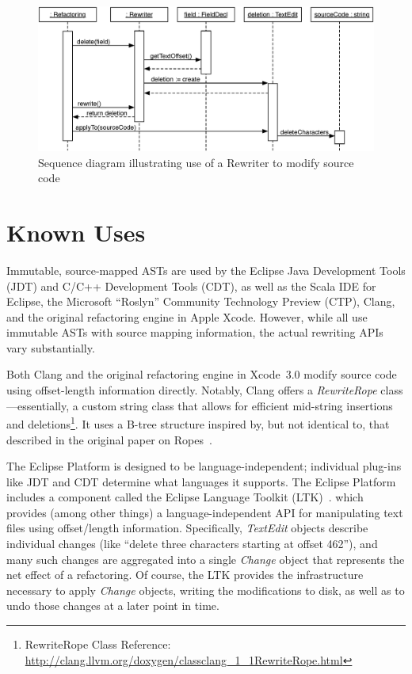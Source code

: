 \documentclass[prodmode]{acmlarge}
\begin{document}
\begin{itemize}
\begin{figure}[!bt]
\begin{center}
\includegraphics[width=.9\textwidth]{seq-diagram.eps}
\end{center}
\caption{Sequence diagram illustrating use of a Rewriter to modify source code}
\label{fig:seq-diagram}
\end{figure}

\end{itemize}

\section{Known Uses}

Immutable, source-mapped ASTs are used by the Eclipse Java Development Tools
(JDT) and C/C++ Development Tools (CDT), as well as the Scala IDE for Eclipse,
the Microsoft ``Roslyn'' Community Technology Preview (CTP), Clang, and the
original refactoring engine in Apple Xcode.  However, while all use immutable
ASTs with source mapping information, the actual rewriting APIs vary
substantially.  

Both Clang and the original refactoring engine in Xcode~3.0 modify source code
using offset-length information directly.  Notably, Clang offers a
\textit{RewriteRope} class---essentially, a custom string class that allows for
efficient mid-string insertions and
deletions\footnote{RewriteRope Class Reference: \url{http://clang.llvm.org/doxygen/classclang_1_1RewriteRope.html}}.
It uses a B-tree structure inspired by, but not identical to, that described
in the original paper on Ropes~\cite{boehm95ropes}.
 
The Eclipse Platform is designed to be language-independent; individual
plug-ins like JDT and CDT determine what languages it supports.  The Eclipse
Platform includes a component called the Eclipse Language Toolkit
(LTK)~\cite{ltk}.  which provides (among other things) a language-independent
API for manipulating text files using offset/length information.  Specifically,
\textit{TextEdit} objects describe individual changes (like ``delete three
characters starting at offset 462''), and many such changes are aggregated into
a single \textit{Change} object that represents the net effect of a
refactoring.  Of course, the LTK provides the infrastructure necessary to apply
\textit{Change} objects, writing the modifications to disk, as well as to undo
those changes at a later point in time.
\end{document}
